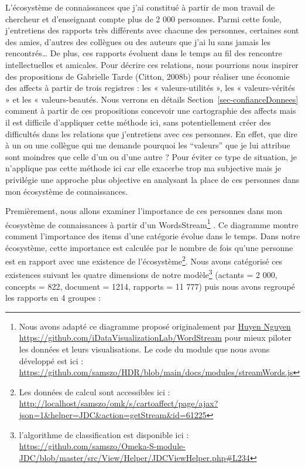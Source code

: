\documentclass[
  a4paper,
  DIV=11,
  numbers=noendperiod]{scrreprt}
\begin{document}
L'écosystème de connaissances que j'ai constitué à partir de mon travail
de chercheur et d'enseignant compte plus de 2 000 personnes. Parmi cette
foule, j'entretiens des rapports très différents avec chacune des
personnes, certaines sont des amies, d'autres des collègues ou des
auteurs que j'ai lu sans jamais les rencontrés\ldots{} De plus, ces
rapports évoluent dans le temps au fil des rencontre intellectuelles et
amicales. Pour décrire ces relations, nous pourrions nous inspirer des
propositions de Gabrielle Tarde (Citton, 2008b) pour réaliser une
économie des affects à partir de trois registres : les «
valeurs-utilités », les « valeurs-vérités » et les « valeurs-beautés.
Nous verrons en détails Section~\ref{sec-confianceDonnees} comment à
partir de ces propositions concevoir une cartographie des affects mais
il est difficile d'appliquer cette méthode ici, sans potentiellement
créer des difficultés dans les relations que j'entretiens avec ces
personnes. En effet, que dire à un ou une collègue qui me demande
pourquoi les ``valeurs'' que je lui attribue sont moindres que celle
d'un ou d'une autre ? Pour éviter ce type de situation, je n'applique
pas cette méthode ici car elle exacerbe trop ma subjective mais je
privilégie une approche plus objective en analysant la place de ces
personnes dans mon écosystème de connaissances.

Premièrement, nous allons examiner l'importance de ces personnes dans
mon écosystème de connaissances à partir d'un WordsStream\footnote{Nous
  avons adapté ce diagramme proposé originalement par
  \href{https://github.com/huyen-nguyen}{Huyen Nguyen}
  \url{https://github.com/iDataVisualizationLab/WordStream} pour mieux
  piloter les données et leurs visualisations. Le code du module que
  nous avons développé est ici :
  \url{https://github.com/samszo/HDR/blob/main/docs/modules/streamWords.js}}
. Ce diagramme montre comment l'importance des items d'une catégorie
évolue dans le temps. Dans notre écosystème, cette importance est
calculée par le nombre de fois qu'une personne est en rapport avec une
existence de l'écosystème\footnote{Les données de calcul sont
  accessibles ici :
  \url{http://localhost/samszo/omk/s/cartoaffect/page/ajax?json=1&helper=JDC&action=getStream&id=61225}}.
Nous avons catégorisé ces existences suivant les quatre dimensions de
notre modèle\footnote{l'algorithme de classification est disponible ici
  :
  \url{https://github.com/samszo/Omeka-S-module-JDC/blob/master/src/View/Helper/JDCViewHelper.php\#L234}}
(actants = 2 000, concepts = 822, document = 1214, rapports = 11 777)
puis nous avons regroupé les rapports en 4 groupes :
\end{document}
